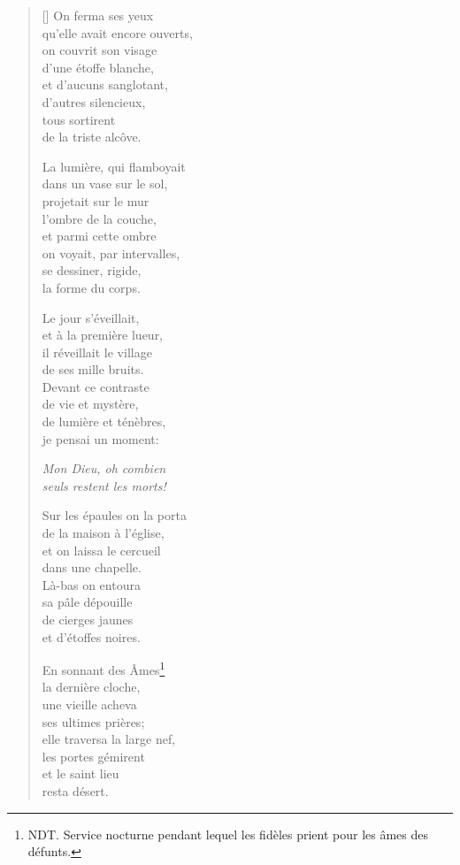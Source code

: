 \documentclass[a4paper,12pt]{book}
\begin{document}
\settowidth{\versewidth}{D'une horloge on entendait}

\begin{verse}[\versewidth]
  On ferma ses yeux \\
  qu'elle avait encore ouverts, \\
  on couvrit son visage \\
  d'une étoffe blanche, \\
  et d'aucuns sanglotant, \\
  d'autres silencieux, \\
  tous sortirent \\
  de la triste alcôve.

  La lumière, qui flamboyait \\
  dans un vase sur le sol, \\
  projetait sur le mur \\
  l'ombre de la couche, \\
  et parmi cette ombre \\
  on voyait, par intervalles, \\
  se dessiner, rigide, \\
  la forme du corps.

  Le jour s'éveillait, \\
  et à la première lueur, \\
  il réveillait le village \\
  de ses mille bruits. \\
  Devant ce contraste \\
  de vie et mystère, \\
  de lumière et ténèbres, \\
  je pensai un moment:

  \emph{Mon Dieu, oh combien \\
  seuls restent les morts!}

  Sur les épaules on la porta \\
  de la maison à l'église, \\
  et on laissa le cercueil \\
  dans une chapelle. \\
  Là-bas on entoura \\
  sa pâle dépouille \\
  de cierges jaunes \\
  et d'étoffes noires.

  En sonnant des Âmes\footnote{NDT. Service nocturne pendant lequel les
  fidèles prient pour les âmes des défunts.} \\
  la dernière cloche, \\
  une vieille acheva \\
  ses ultimes prières; \\
  elle traversa la large nef, \\
  les portes gémirent \\
  et le saint lieu \\
  resta désert.


\end{verse}
\end{document}
